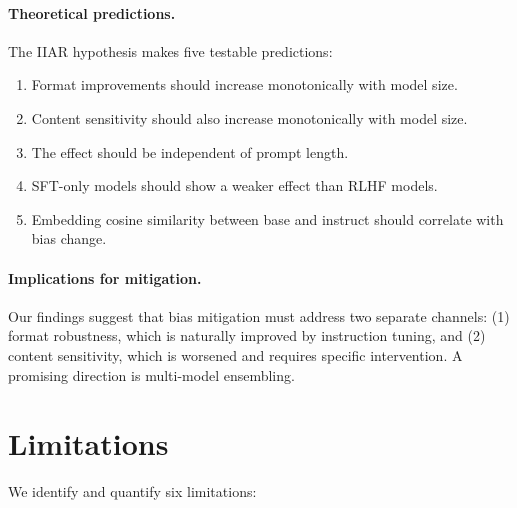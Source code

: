 \documentclass[11pt,preprint,nonatbib]{article}
\begin{document}
\paragraph{Theoretical predictions.}
The IIAR hypothesis makes five testable predictions:
\begin{enumerate}
    \item Format improvements should increase monotonically with model size.
    \item Content sensitivity should also increase monotonically with model size.
    \item The effect should be independent of prompt length.
    \item SFT-only models should show a weaker effect than RLHF models.
    \item Embedding cosine similarity between base and instruct should correlate with bias change.
\end{enumerate}

\paragraph{Implications for mitigation.}
Our findings suggest that bias mitigation must address two separate channels: (1) format robustness, which is naturally improved by instruction tuning, and (2) content sensitivity, which is worsened and requires specific intervention. A promising direction is multi-model ensembling.

\section{Limitations}

We identify and quantify six limitations:
\end{document}
